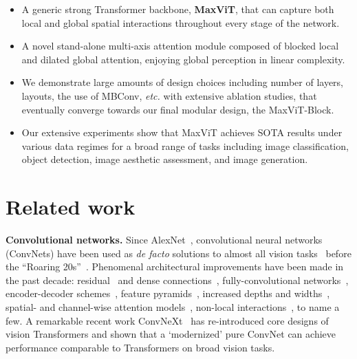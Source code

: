 \documentclass[runningheads]{llncs}
\def\etc{\emph{etc.} } \def\vs{\emph{vs.} }
\begin{document}
\begin{itemize}[leftmargin=*]
\itemsep0em 
    \item A generic strong Transformer backbone, \textbf{MaxViT}, that can capture both local and global spatial interactions throughout every stage of the network.
\item A novel stand-alone multi-axis attention module composed of blocked local and dilated global attention, enjoying global perception in linear complexity.
\item We demonstrate large amounts of design choices including number of layers, layouts, the use of MBConv, \etc with extensive ablation studies, that eventually converge towards our final modular design, the MaxViT-Block.
    \item Our extensive experiments show that MaxViT achieves SOTA results under various data regimes for a broad range of tasks including image classification, object detection, image aesthetic assessment, and image generation.

\end{itemize}








\section{Related work}

\textbf{Convolutional networks.}
Since AlexNet~\cite{krizhevsky2012imagenet}, convolutional neural networks (ConvNets) have been used as \textit{de facto} solutions to almost all vision tasks~\cite{he2016deep,chen2020proxiqa,huang2017densely,zhao2022tracking,chen2022learning,li2021comisr,whang2022deblurring,talebi2021learning,wang2021rich} before the ``Roaring 20s''~\cite{liu2022convnet}. Phenomenal architectural improvements have been made in the past decade: residual~\cite{he2016deep} and dense connections~\cite{huang2017densely}, fully-convolutional networks~\cite{long2015fully}, encoder-decoder schemes~\cite{ronneberger2015u}, feature pyramids~\cite{Lin2017FeaturePN}, increased depths and widths~\cite{szegedy2015going}, spatial- and channel-wise attention models~\cite{hu2018squeeze,woo2018cbam}, non-local interactions~\cite{wang2018non}, to name a few. A remarkable recent work ConvNeXt~\cite{liu2022convnet} has re-introduced core designs of vision Transformers and shown that a `modernized' pure ConvNet can achieve  performance comparable to Transformers on broad vision tasks.
\end{document}
